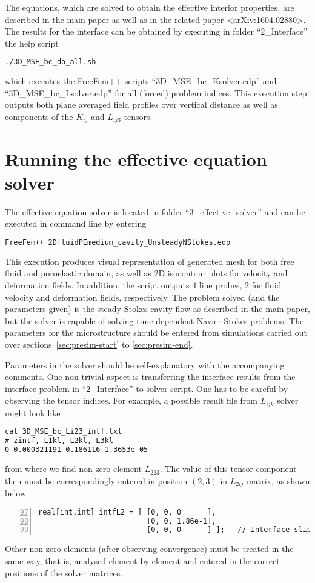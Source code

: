 \documentclass[12pt,a4paper]{article}
\begin{document}
The equations, which are solved to obtain the effective interior properties, are described in the main paper as well as in the related paper <arXiv:1604.02880>. The results for the interface can be obtained by executing in folder ``2\_Interface'' the help script
\begin{lstlisting}[language=tex]
./3D_MSE_bc_do_all.sh
\end{lstlisting}
which executes the FreeFem++ scripts ``3D\_MSE\_bc\_Ksolver.edp'' and ``3D\_MSE\_bc\_Lsolver.edp'' for all (forced) problem indices. This execution step outputs both plane averaged field profiles over vertical distance as well as components of the $K_{ij}$ and $L_{ij3}$ tensors.

\section{Running the effective equation solver}

The effective equation solver is located in folder ``3\_effective\_solver'' and can be executed in command line by entering
\begin{lstlisting}[language=tex]
FreeFem++ 2DfluidPEmedium_cavity_UnsteadyNStokes.edp
\end{lstlisting}
This execution produces visual representation of generated mesh for both free fluid and poroelastic domain, as well as 2D isocontour plots for velocity and deformation fields. In addition, the script outputs $4$ line probes, $2$ for fluid velocity and deformation fields, respectively. The problem solved (and the parameters given) is the steady Stokes cavity flow as described in the main paper, but the solver is capable of solving time-dependent Navier-Stokes problems. The parameters for the microstructure should be entered from simulations carried out over sections~\ref{sec:presim-start} to \ref{sec:presim-end}.

Parameters in the solver should be self-explanatory with the accompanying comments. One non-trivial aspect is transferring the interface results from the interface problem in ``2\_Interface'' to solver script. One has to be careful by observing the tensor indices. For example, a possible result file from $L_{ijk}$ solver might look like
\begin{lstlisting}[language=tex]
cat 3D_MSE_bc_Li23_intf.txt
# zintf, L1kl, L2kl, L3kl
0 0.000321191 0.186116 1.3653e-05
\end{lstlisting}
from where we find non-zero element $L_{223}$. The value of this tensor component then must be correspondingly entered in position $(2,3)$ in $L_{2ij}$ matrix, as shown below
\begin{lstlisting}[numbers=left,firstnumber=97]
real[int,int] intfL2 = [ [0, 0, 0      ],
                         [0, 0, 1.86e-1],
                         [0, 0, 0      ] ];   // Interface slip length matrix L2kl   
\end{lstlisting}
Other non-zero elements (after observing convergence) must be treated in the same way, that is, analysed element by element and entered in the correct positions of the solver matrices.
\end{document}
